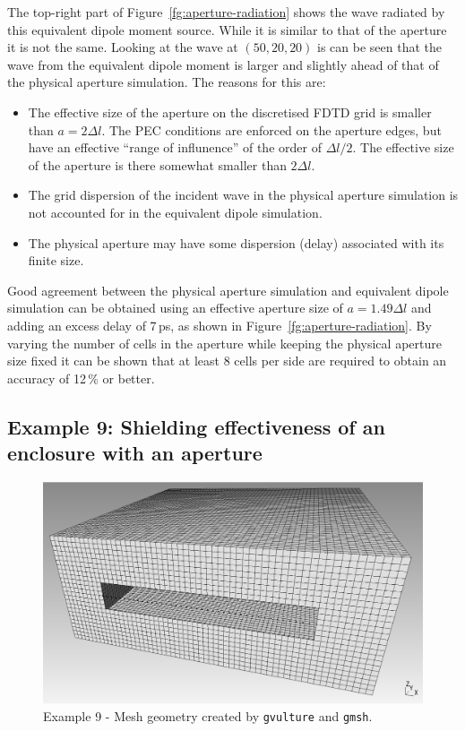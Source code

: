 \documentclass[onecolumn,a4paper]{article}
\numberwithin{equation}{section}
\begin{document}
The top-right part of Figure~\ref{fg:aperture-radiation} shows the wave radiated by this equivalent 
dipole moment source. While it is similar to that of the aperture it is not the same. Looking at
the wave at $(50,20,20)$ is can be seen that the wave from the equivalent dipole moment is larger 
and slightly ahead of that of the physical aperture simulation. The reasons for this are:
\begin{itemize}
 \item The effective size of the aperture on the discretised FDTD grid is smaller than $a=2\Delta l$.
 The PEC conditions are enforced on the aperture edges, but have an effective ``range of influnence'' of
 the order of $\Delta l/2$. The effective size of the aperture is there somewhat smaller than $2\Delta l$.
 \item The grid dispersion of the incident wave in the physical aperture simulation is not accounted for
 in the equivalent dipole simulation.
 \item The physical aperture may have some dispersion (delay) associated with its finite size.
\end{itemize}
Good agreement between the physical aperture simulation and equivalent dipole simulation can be obtained
using an effective aperture size of $a=1.49\Delta l$ and adding an excess delay of 7\,ps, as shown in
Figure~\ref{fg:aperture-radiation}. By varying the number of cells in the aperture while keeping the
physical aperture size fixed it can be shown that at least 8 cells per side are required to obtain
an accuracy of 12\,\% or better.

\subsection{Example 9: Shielding effectiveness of an enclosure with an aperture}

\begin{figure}[ht]
 \centerline{\includegraphics[width=12cm]{figures/enclosure_se-mesh}}
 \caption{\label{fg:enclosure_se-mesh} Example 9 - Mesh geometry created by \texttt{gvulture} and \texttt{gmsh}.}
\end{figure}
\end{document}
